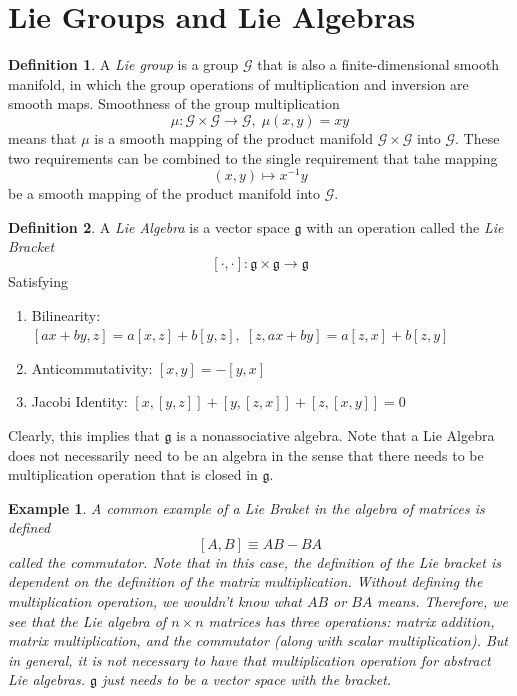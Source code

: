 \documentclass{article}
\newtheorem{example}{Example}[section]
\theoremstyle{remark}
\theoremstyle{definition}
\newtheorem{definition}{Definition}[section]
\begin{document}
\section{Lie Groups and Lie Algebras}

\begin{definition}
A \textit{Lie group} is a group $\mathcal{G}$ that is also a finite-dimensional smooth manifold, in which the group operations of multiplication and inversion are smooth maps. Smoothness of the group multiplication
\[\mu: \mathcal{G} \times \mathcal{G} \longrightarrow \mathcal{G}, \; \mu(x, y) = x y\]
means that $\mu$ is a smooth mapping of the product manifold $\mathcal{G} \times \mathcal{G}$ into $\mathcal{G}$. These two requirements can be combined to the single requirement that tahe mapping 
\[(x, y) \mapsto x^{-1} y\]
be a smooth mapping of the product manifold into $\mathcal{G}$. 
\end{definition}

\begin{definition}
A \textit{Lie Algebra} is a vector space $\mathfrak{g}$ with an operation called the \textit{Lie Bracket} 
\[[\cdot, \cdot]: \mathfrak{g} \times \mathfrak{g} \longrightarrow \mathfrak{g}\]
Satisfying
\begin{enumerate}
    \item Bilinearity: $[ax + by, z] = a[x,z] + b[y,z], \; [z, ax + by] = a[z, x] + b[z,y]$
    \item Anticommutativity: $[x,y] = -[y,x]$
    \item Jacobi Identity: $[x,[y,z]] + [y,[z,x]] + [z,[x,y]] = 0$
\end{enumerate}
Clearly, this implies that $\mathfrak{g}$ is a nonassociative algebra. Note that a Lie Algebra does not necessarily need to be an algebra in the sense that there needs to be multiplication operation that is closed in $\mathfrak{g}$. 
\end{definition}

\begin{example}
A common example of a Lie Braket in the algebra of matrices is defined
\[[A, B] \equiv AB - BA\]
called the \textit{commutator}. Note that in this case, the definition of the Lie bracket is dependent on the definition of the matrix multiplication. Without defining the multiplication operation, we wouldn't know what $AB$ or $BA$ means. Therefore, we see that the Lie algebra of $n \times n$ matrices has three operations: matrix addition, matrix multiplication, and the commutator (along with scalar multiplication). But in general, it is not necessary to have that multiplication operation for abstract Lie algebras. $\mathfrak{g}$ just needs to be a vector space with the bracket.  
\end{example}
\end{document}
